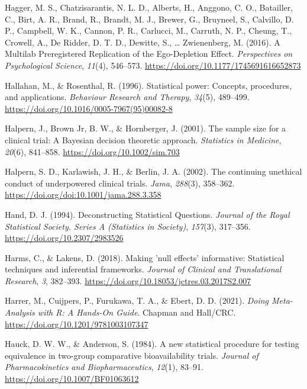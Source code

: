 \documentclass[
  oneside]{krantz}
\newlength{\cslhangindent}
\newlength{\cslentryspacingunit} %
\newenvironment{CSLReferences}[2] %
 {%
  \setlength{\parindent}{0pt}
  \ifodd #1
  \let\oldpar\par
  \def\par{\hangindent=\cslhangindent\oldpar}
  \fi
  \setlength{\parskip}{#2\cslentryspacingunit}
 }%
 {}
\begin{document}
\begin{CSLReferences}{1}{0}
\leavevmode{}%
Hagger, M. S., Chatzisarantis, N. L. D., Alberts, H., Anggono, C. O.,
Batailler, C., Birt, A. R., Brand, R., Brandt, M. J., Brewer, G.,
Bruyneel, S., Calvillo, D. P., Campbell, W. K., Cannon, P. R., Carlucci,
M., Carruth, N. P., Cheung, T., Crowell, A., De Ridder, D. T. D.,
Dewitte, S., \ldots{} Zwienenberg, M. (2016). A {Multilab Preregistered
Replication} of the {Ego-Depletion Effect}. \emph{Perspectives on
Psychological Science}, \emph{11}(4), 546--573.
\url{https://doi.org/10.1177/1745691616652873}

\leavevmode{}%
Hallahan, M., \& Rosenthal, R. (1996). Statistical power: {Concepts},
procedures, and applications. \emph{Behaviour Research and Therapy},
\emph{34}(5), 489--499.
\url{https://doi.org/10.1016/0005-7967(95)00082-8}

\leavevmode{}%
Halpern, J., Brown Jr, B. W., \& Hornberger, J. (2001). The sample size
for a clinical trial: {A Bayesian} decision theoretic approach.
\emph{Statistics in Medicine}, \emph{20}(6), 841--858.
\url{https://doi.org/10.1002/sim.703}

\leavevmode{}%
Halpern, S. D., Karlawish, J. H., \& Berlin, J. A. (2002). The
continuing unethical conduct of underpowered clinical trials.
\emph{Jama}, \emph{288}(3), 358--362.
\url{https://doi.org/doi:10.1001/jama.288.3.358}

\leavevmode{}%
Hand, D. J. (1994). Deconstructing {Statistical Questions}.
\emph{Journal of the Royal Statistical Society. Series A (Statistics in
Society)}, \emph{157}(3), 317--356.
\url{https://doi.org/10.2307/2983526}

\leavevmode{}%
Harms, C., \& Lakens, D. (2018). Making 'null effects' informative:
Statistical techniques and inferential frameworks. \emph{Journal of
Clinical and Translational Research}, \emph{3}, 382--393.
\url{https://doi.org/10.18053/jctres.03.2017S2.007}

\leavevmode{}%
Harrer, M., Cuijpers, P., Furukawa, T. A., \& Ebert, D. D. (2021).
\emph{Doing {Meta-Analysis} with {R}: {A Hands-On Guide}}. {Chapman and
Hall/CRC}. \url{https://doi.org/10.1201/9781003107347}

\leavevmode{}%
Hauck, D. W. W., \& Anderson, S. (1984). A new statistical procedure for
testing equivalence in two-group comparative bioavailability trials.
\emph{Journal of Pharmacokinetics and Biopharmaceutics}, \emph{12}(1),
83--91. \url{https://doi.org/10.1007/BF01063612}


\end{CSLReferences}
\end{document}
